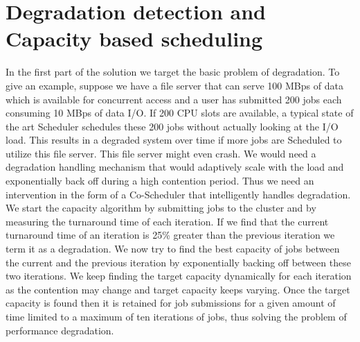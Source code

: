 \documentclass[ms,electronic,double]{nuthesis}
\begin{document}
\section{Degradation detection and Capacity based scheduling}
In the first part of the solution we target the basic problem of degradation. To give an example, suppose
we have a file server that can serve 100 MBps of data which is available for concurrent access and a user has submitted 200 jobs
each consuming 10 MBps of data I/O. If 200 CPU slots are available, a typical state of the art Scheduler
schedules these 200 jobs without actually looking at the I/O load. This results in a degraded system 
over time if more jobs are Scheduled to utilize this file server. This file server might even crash. We would need a 
degradation handling mechanism that would adaptively scale with the load and  exponentially 
back off during a high contention period. Thus we need an intervention in the form
of a Co-Scheduler that intelligently handles degradation.
We start the capacity algorithm by submitting jobs to the cluster and by measuring 
the turnaround time of each iteration. If we find that the current turnaround 
time of an iteration is 25\% greater than the previous iteration we term it as a 
degradation. We now try to find the best capacity of jobs between the current 
and the previous iteration by exponentially backing off between these two iterations. We keep finding the 
target capacity dynamically for each iteration as the contention may change and target capacity keeps 
 varying. Once the target capacity is found then it is retained for job submissions for a given amount of time
 limited to a maximum of ten iterations of jobs, thus solving the problem of performance degradation. 
\end{document}
